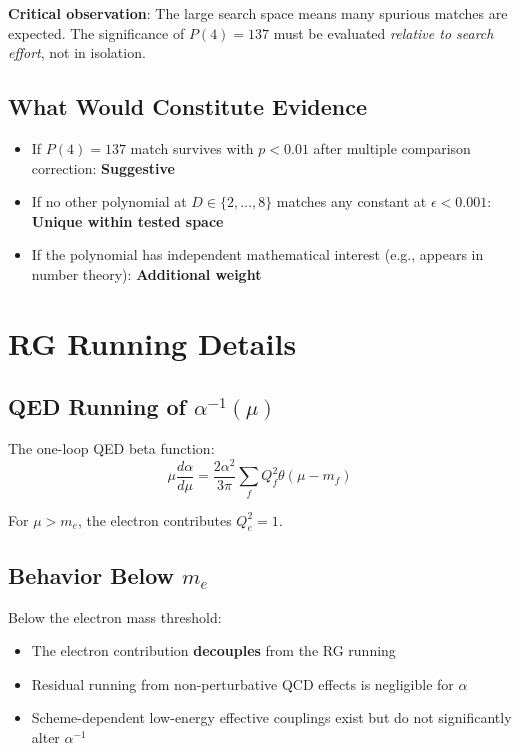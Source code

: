 \documentclass[11pt,a4paper]{article}
\begin{document}
\textbf{Critical observation}: The large search space means many spurious matches are expected. The significance of $P(4) = 137$ must be evaluated \textit{relative to search effort}, not in isolation.

\subsection{What Would Constitute Evidence}

\begin{itemize}
    \item If $P(4) = 137$ match survives with $p < 0.01$ after multiple comparison correction: \textbf{Suggestive}
    \item If no other polynomial at $D \in \{2,\ldots,8\}$ matches any constant at $\epsilon < 0.001$: \textbf{Unique within tested space}
    \item If the polynomial has independent mathematical interest (e.g., appears in number theory): \textbf{Additional weight}
\end{itemize}

\section{RG Running Details}

\subsection{QED Running of $\alpha^{-1}(\mu)$}

The one-loop QED beta function:
\begin{equation}
\mu \frac{d\alpha}{d\mu} = \frac{2\alpha^2}{3\pi} \sum_f Q_f^2 \theta(\mu - m_f)
\end{equation}

For $\mu > m_e$, the electron contributes $Q_e^2 = 1$.

\subsection{Behavior Below $m_e$}

Below the electron mass threshold:
\begin{itemize}
    \item The electron contribution \textbf{decouples} from the RG running
    \item Residual running from non-perturbative QCD effects is negligible for $\alpha$
    \item Scheme-dependent low-energy effective couplings exist but do not significantly alter $\alpha^{-1}$
\end{itemize}
\end{document}

